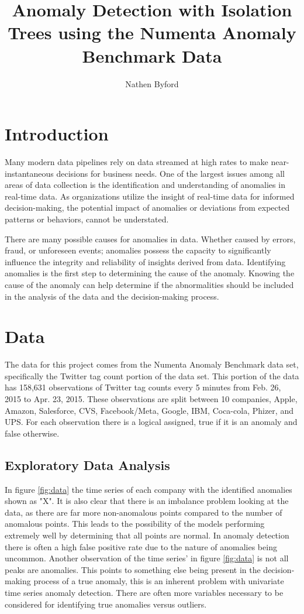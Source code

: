 \documentclass{article}
\title{Anomaly Detection with Isolation Trees using the Numenta Anomaly Benchmark Data}
\author{Nathen Byford}
\date{}
\begin{document}
\maketitle
\thispagestyle{empty}

\newpage

\tableofcontents

\newpage 

\section{Introduction}
Many modern data pipelines rely on data streamed at high rates to make near-instantaneous decisions for business needs. One of the largest issues among all areas of data collection is the identification and understanding of anomalies in real-time data. As organizations utilize the insight of real-time data for informed decision-making, the potential impact of anomalies or deviations from expected patterns or behaviors, cannot be understated. 

There are many possible causes for anomalies in data. Whether caused by errors, fraud, or unforeseen events; anomalies possess the capacity to significantly influence the integrity and reliability of insights derived from data. Identifying anomalies is the first step to determining the cause of the anomaly. Knowing the cause of the anomaly can help determine if the abnormalities should be included in the analysis of the data and the decision-making process.

\section{Data}
The data for this project comes from the Numenta Anomaly Benchmark data set, specifically the Twitter tag count portion of the data set. This portion of the data has 158,631 observations of Twitter tag counts every 5 minutes from Feb. 26, 2015 to Apr. 23, 2015. These observations are split between 10 companies, Apple, Amazon, Salesforce, CVS, Facebook/Meta, Google, IBM, Coca-cola, Phizer, and UPS. For each observation there is a logical assigned, true if it is an anomaly and false otherwise.

\subsection{Exploratory Data Analysis}
In figure \ref{fig:data} the time series of each company with the identified anomalies shown as "X". It is also clear that there is an imbalance problem looking at the data, as there are far more non-anomalous points compared to the number of anomalous points. This leads to the possibility of the models performing extremely well by determining that all points are normal. In anomaly detection there is often a high false positive rate due to the nature of anomalies being uncommon. Another observation of the time series' in figure \ref{fig:data} is not all peaks are anomalies. This points to something else being present in the decision-making process of a true anomaly, this is an inherent problem with univariate time series anomaly detection. There are often more variables necessary to be considered for identifying true anomalies versus outliers.
\end{document}

